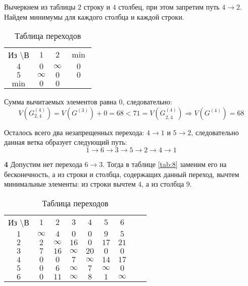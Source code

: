 Вычеркнем из таблицы $2$ строку и $4$ столбец, при этом запретим путь $4 \rightarrow 2$. Найдем минимумы для каждого столбца и каждой строки.

\begin{table}[H]
\begin{center}
	\def\tabcolsep{15pt}
	\caption{Таблица переходов}
	\label{tab:18}
	\begin{tabular}{|c||c|c|c|}
		\hline
		Из \textbackslash В & $1$ & $2$ & $\min$ \\
		\hhline{|=#=|=|=|}
		$4$ & $0$ & $\infty$ & $0$ \\
		\hline
		$5$ & $\infty$ & $0$ & $0$ \\
		\hhline{|=#=|=|=|} 
		$\min$ & $0$ & $0$ & \\ 
		\hline
	\end{tabular}
\end{center}
\end{table}

Сумма вычитаемых элементов равна $0$, следовательно:
\begin{equation*}
V(G_{2,4}^{(4)}) = V(G^{(3)}) + 0 = 68 < 71 = V(G_{\overline{2,4}}^{(4)}) \Rightarrow V(G^{(4)}) = 68
\end{equation*}

Осталось всего два незапрещенных перехода: $4 \rightarrow 1$ и $5 \rightarrow 2$, следовательно данная ветка образует следующий путь:
\begin{equation*}
1 \rightarrow 6 \rightarrow 3 \rightarrow 5 \rightarrow 2 \rightarrow 4 \rightarrow 1
\end{equation*}

\textbf{4} Допустим нет перехода $6 \rightarrow 3$. Тогда в таблице \ref{tab:8} заменим его на бесконечность, а из строки и столбца, содержащих данный переход, вычтем минимальные элементы: из строки вычтем $4$, а из столбца $9$.

\begin{table}[H]
\begin{center}
	\def\tabcolsep{15pt}
	\caption{Таблица переходов}
	\label{tab:19}
	\begin{tabular}{|c||c|c|c|c|c|c|c|c|}
		\hline
		Из \textbackslash В & $1$ & $2$ & $3$ & $4$ & $5$ & $6$ \\
		\hhline{|=#=|=|=|=|=|=|}
		$1$ & $\infty$ & $4$ & $0$ & $0$ & $9$ & $5$ \\
		\hline
		$2$ & $2$ & $\infty$ & $16$ & $0$ & $17$ & $21$ \\
		\hline
		$3$ & $7$ & $16$ & $\infty$ & $20$ & $0$ & $0$ \\ 
		\hline
		$4$ & $0$ & $0$ & $7$ & $\infty$ & $14$ & $17$ \\
		\hline
		$5$ & $0$ & $6$ & $\infty$ & $7$ & $\infty$ & $0$ \\
		\hline
		$6$ & $0$ & $11$ & $\infty$ & $8$ & $1$ & $\infty$ \\ 
		\hline
	\end{tabular}
\end{center}
\end{table}

